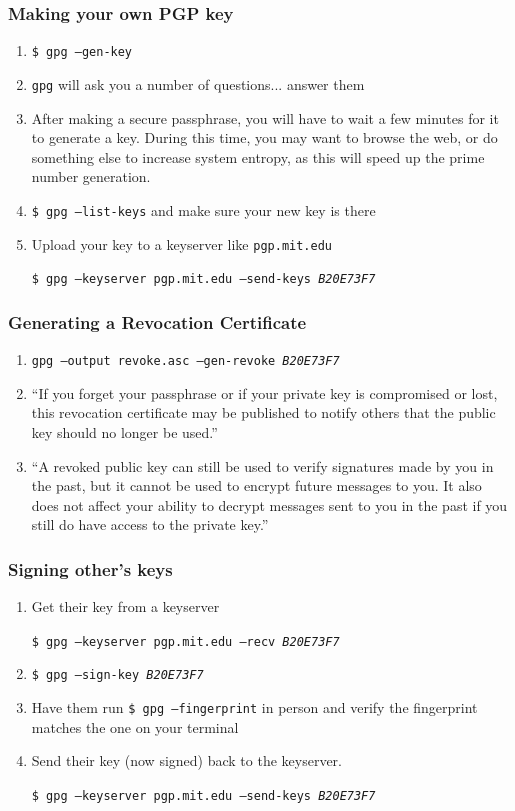 \documentclass{beamer}
\begin{document}
\begin{frame}
    \frametitle{Making your own PGP key}
    \begin{enumerate}[<+->]
        \item \texttt{\$ gpg --gen-key}
        \item \texttt{gpg} will ask you a number of questions... answer them
        \item After making a secure passphrase, you will have to wait a few
            minutes for it to generate a key. During this time, you may want to
            browse the web, or do something else to increase system entropy, as
            this will speed up the prime number generation.
        \item \texttt{\$ gpg --list-keys} and make sure your new key is there
        \item Upload your key to a keyserver like \texttt{pgp.mit.edu}\par
            \texttt{\small \$ gpg --keyserver pgp.mit.edu --send-keys \emph{B20E73F7}}
    \end{enumerate}
\end{frame}

\begin{frame}
	\frametitle{Generating a Revocation Certificate}
	\begin{enumerate}[<+->]
		\item \texttt{gpg --output revoke.asc --gen-revoke \emph{B20E73F7}}
		\item ``If you forget your passphrase or if your private key is compromised or lost, this revocation certificate may be published to
			notify others that the public key should no longer be used.''
		\item ``A revoked public key can still be used to verify signatures made by you in the past, but it cannot be used to encrypt future
			messages to you. It also does not affect your ability to decrypt messages sent to you in the past if you still do have access
			to the private key.''
	\end{enumerate}
\end{frame}

\begin{frame}
    \frametitle{Signing other's keys}
    \begin{enumerate}[<+->]
        \item Get their key from a keyserver\par
            \texttt{\small \$ gpg --keyserver pgp.mit.edu --recv \emph{B20E73F7}}
        \item \texttt{\$ gpg --sign-key \emph{B20E73F7}}
        \item Have them run \texttt{\$ gpg --fingerprint} in person and verify
            the fingerprint matches the one on your terminal
        \item Send their key (now signed) back to the keyserver.\par
            \texttt{\small \$ gpg --keyserver pgp.mit.edu --send-keys \emph{B20E73F7}}
    \end{enumerate}
\end{frame}
\end{document}
